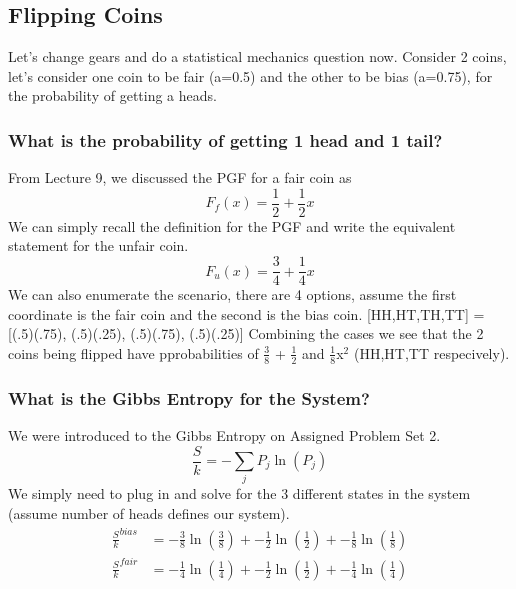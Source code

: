 \documentclass{article}
\begin{document}
\subsection*{Flipping Coins}
Let's change gears and do a statistical mechanics question now. 
Consider 2 coins, let's consider one coin to be fair (a=0.5) and the other to be bias (a=0.75), for the probability of getting a heads. 

\subsubsection*{What is the probability of getting 1 head and 1 tail?}

From Lecture 9, we discussed the PGF for a fair coin as 
\begin{equation}
F_f(x) = \frac{1}{2}+\frac{1}{2}x
\end{equation}
We can simply recall the definition for the PGF and write the equivalent statement for the unfair coin.
\begin{equation}
F_u(x) = \frac{3}{4}+\frac{1}{4}x
\end{equation}
We can also enumerate the scenario, there are 4 options, assume the first coordinate is the fair coin and the second is the bias coin.
[HH,HT,TH,TT] = [(.5)(.75), (.5)(.25), (.5)(.75), (.5)(.25)]
Combining the cases we see that the 2 coins being flipped have pprobabilities of $\frac{3}{8}$ + $\frac{1}{2}$ and $\frac{1}{8}$x$^2$ (HH,HT,TT respecively).

\subsubsection*{What is the Gibbs Entropy for the System?}
We were introduced to the Gibbs Entropy on Assigned Problem Set 2.
\begin{equation}
\frac{S}{k}= -\sum_jP_j\ln(P_j)
 \end{equation}
We simply need to plug in and solve for the 3 different states in the system (assume number of heads defines our system).
\begin{equation}
    \begin{split}
    \frac{S}{k}^{bias} &= -\frac{3}{8}\ln \left(\frac{3}{8}\right) + -\frac{1}{2}\ln\left(\frac{1}{2}\right) + -\frac{1}{8}\ln\left(\frac{1}{8}\right) \\
    \frac{S}{k}^{fair} &= -\frac{1}{4}\ln \left(\frac{1}{4}\right) + -\frac{1}{2}\ln\left(\frac{1}{2}\right) + -\frac{1}{4}\ln\left(\frac{1}{4}\right)
        \end{split}
\end{equation}
\end{document}
